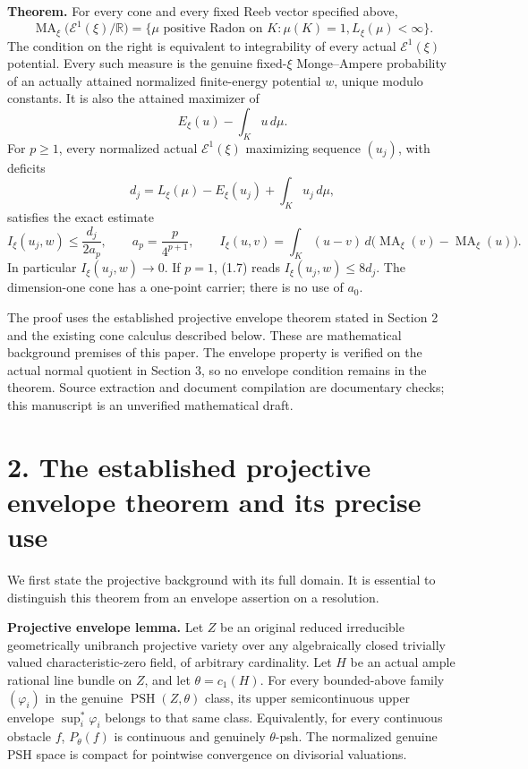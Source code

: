 \documentclass[
  10pt,
]{article}
\begin{document}
\textbf{Theorem.} For every cone and every fixed Reeb vector specified
above, \[
 \operatorname{MA}_\xi\bigl(\mathcal E^1(\xi)/\mathbb R\bigr)
 =\{\mu\text{ positive Radon on }K:\mu(K)=1, L_\xi(\mu)<\infty\}.
                                                               \tag{1.6}
\] The condition on the right is equivalent to integrability of every
actual \(\mathcal E^1(\xi)\) potential. Every such measure is the
genuine fixed-\(\xi\) Monge--Ampere probability of an actually attained
normalized finite-energy potential \(w\), unique modulo constants. It is
also the attained maximizer of \[
                  E_\xi(u)-\int_Ku\,d\mu.
\] For \(p\geq1\), every normalized actual \(\mathcal E^1(\xi)\)
maximizing sequence \((u_j)\), with deficits \[
 d_j=L_\xi(\mu)-E_\xi(u_j)+\int_Ku_j\,d\mu,
\] satisfies the exact estimate \[
 I_\xi(u_j,w)\leq\frac{d_j}{2a_p},\qquad
 a_p=\frac{p}{4^{p+1}},\qquad
 I_\xi(u,v)=\int_K(u-v)\,d\bigl(\operatorname{MA}_\xi(v)
                                      -\operatorname{MA}_\xi(u)\bigr).
                                                               \tag{1.7}
\] In particular \(I_\xi(u_j,w)\to0\). If \(p=1\), (1.7) reads
\(I_\xi(u_j,w)\leq8d_j\). The dimension-one cone has a one-point
carrier; there is no use of \(a_0\).

The proof uses the established projective envelope theorem stated in
Section 2 and the existing cone calculus described below. These are
mathematical background premises of this paper. The envelope property is
verified on the actual normal quotient in Section 3, so no envelope
condition remains in the theorem. Source extraction and document
compilation are documentary checks; this manuscript is an unverified
mathematical draft.

\section{2. The established projective envelope theorem and its precise
use}\label{the-established-projective-envelope-theorem-and-its-precise-use}

We first state the projective background with its full domain. It is
essential to distinguish this theorem from an envelope assertion on a
resolution.

\textbf{Projective envelope lemma.} Let \(Z\) be an original reduced
irreducible geometrically unibranch projective variety over any
algebraically closed trivially valued characteristic-zero field, of
arbitrary cardinality. Let \(H\) be an actual ample rational line bundle
on \(Z\), and let \(\theta=c_1(H)\). For every bounded-above family
\((\varphi_i)\) in the genuine \(\operatorname{PSH}(Z,\theta)\) class,
its upper semicontinuous upper envelope \(\sup_i^*\varphi_i\) belongs to
that same class. Equivalently, for every continuous obstacle \(f\),
\(P_\theta(f)\) is continuous and genuinely \(\theta\)-psh. The
normalized genuine PSH space is compact for pointwise convergence on
divisorial valuations.
\end{document}
